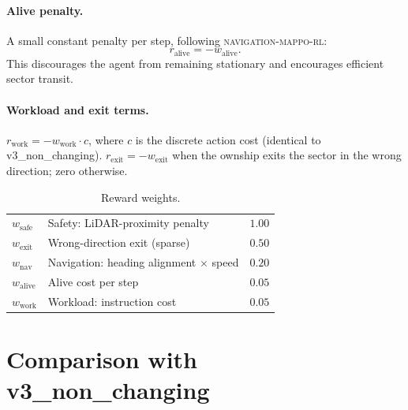 \documentclass[11pt, a4paper]{article}
\begin{document}
\paragraph{Alive penalty.}
A small constant penalty per step, following \textsc{navigation-mappo-rl}:
\begin{equation}
    r_\text{alive} = -w_\text{alive}.
\end{equation}
This discourages the agent from remaining stationary and encourages efficient
sector transit.

\paragraph{Workload and exit terms.}
$r_\text{work} = -w_\text{work}\cdot c$, where $c$ is the discrete action
cost (identical to v3\_non\_changing).
$r_\text{exit} = -w_\text{exit}$ when the ownship exits the sector in the
wrong direction; zero otherwise.

\begin{table}[h]
\centering
\caption{Reward weights.}
\smallskip
\begin{tabular}{llr}
\toprule
$w_\text{safe}$  & Safety: LiDAR-proximity penalty           & $1.00$ \\
$w_\text{exit}$  & Wrong-direction exit (sparse)             & $0.50$ \\
$w_\text{nav}$   & Navigation: heading alignment $\times$ speed & $0.20$ \\
$w_\text{alive}$ & Alive cost per step                       & $0.05$ \\
$w_\text{work}$  & Workload: instruction cost                & $0.05$ \\
\bottomrule
\end{tabular}
\end{table}

\section{Comparison with v3\_non\_changing}
\end{document}
